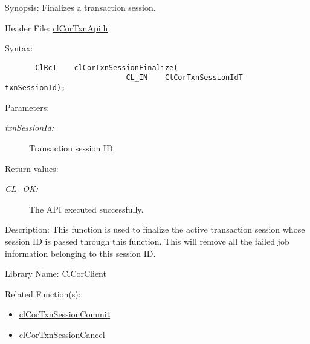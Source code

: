 \begin{Desc}
\item[Synopsis:]Finalizes a transaction session.\end{Desc}
\begin{Desc}
\item[Header File:]\hyperlink{cl_cor_txn_api_8h}{cl\-Cor\-Txn\-Api.h}\end{Desc}
\begin{Desc}
\item[Syntax:]

\footnotesize\begin{verbatim}       ClRcT    clCorTxnSessionFinalize(
                            CL_IN    ClCorTxnSessionIdT  txnSessionId);
\end{verbatim}
\normalsize
\end{Desc}
\begin{Desc}
\item[Parameters:]
\begin{description}
\item[{\em txn\-Session\-Id:}]Transaction session ID.\end{description}
\end{Desc}
\begin{Desc}
\item[Return values:]
\begin{description}
\item[{\em CL\_\-OK:}]The API executed successfully.\end{description}
\end{Desc}
\begin{Desc}
\item[Description:]This function is used to finalize the active transaction session whose session ID is passed through this function. This will remove all the failed job information belonging to this session ID.\end{Desc}
\begin{Desc}
\item[Library Name:]Cl\-Cor\-Client\end{Desc}
\begin{Desc}
\item[Related Function(s):]\begin{itemize}
\item \hyperlink{group__group13}{cl\-Cor\-Txn\-Session\-Commit} \item \hyperlink{group__group13}{cl\-Cor\-Txn\-Session\-Cancel} \end{itemize}
\end{Desc}

